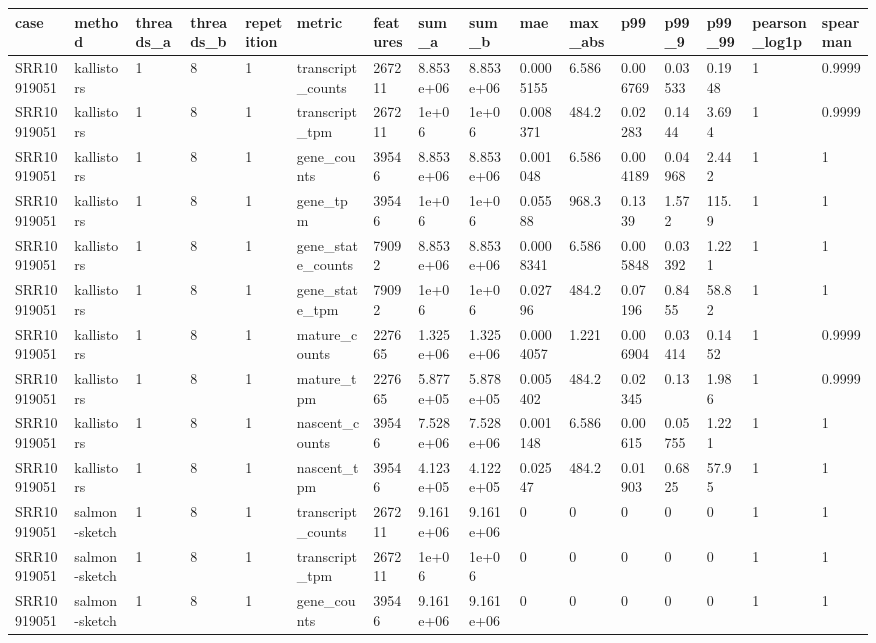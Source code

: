 \begin{tabular}{llllllllllllllll}
\toprule
case & method & threads\_a & threads\_b & repetition & metric & features & sum\_a & sum\_b & mae & max\_abs & p99 & p99\_9 & p99\_99 & pearson\_log1p & spearman \\
\midrule
SRR10919051 & kallistors & 1 & 8 & 1 & transcript\_counts & 267211 & 8.853e+06 & 8.853e+06 & 0.0005155 & 6.586 & 0.006769 & 0.03533 & 0.1948 & 1 & 0.9999 \\
SRR10919051 & kallistors & 1 & 8 & 1 & transcript\_tpm & 267211 & 1e+06 & 1e+06 & 0.008371 & 484.2 & 0.02283 & 0.1444 & 3.694 & 1 & 0.9999 \\
SRR10919051 & kallistors & 1 & 8 & 1 & gene\_counts & 39546 & 8.853e+06 & 8.853e+06 & 0.001048 & 6.586 & 0.004189 & 0.04968 & 2.442 & 1 & 1 \\
SRR10919051 & kallistors & 1 & 8 & 1 & gene\_tpm & 39546 & 1e+06 & 1e+06 & 0.05588 & 968.3 & 0.1339 & 1.572 & 115.9 & 1 & 1 \\
SRR10919051 & kallistors & 1 & 8 & 1 & gene\_state\_counts & 79092 & 8.853e+06 & 8.853e+06 & 0.0008341 & 6.586 & 0.005848 & 0.03392 & 1.221 & 1 & 1 \\
SRR10919051 & kallistors & 1 & 8 & 1 & gene\_state\_tpm & 79092 & 1e+06 & 1e+06 & 0.02796 & 484.2 & 0.07196 & 0.8455 & 58.82 & 1 & 1 \\
SRR10919051 & kallistors & 1 & 8 & 1 & mature\_counts & 227665 & 1.325e+06 & 1.325e+06 & 0.0004057 & 1.221 & 0.006904 & 0.03414 & 0.1452 & 1 & 0.9999 \\
SRR10919051 & kallistors & 1 & 8 & 1 & mature\_tpm & 227665 & 5.877e+05 & 5.878e+05 & 0.005402 & 484.2 & 0.02345 & 0.13 & 1.986 & 1 & 0.9999 \\
SRR10919051 & kallistors & 1 & 8 & 1 & nascent\_counts & 39546 & 7.528e+06 & 7.528e+06 & 0.001148 & 6.586 & 0.00615 & 0.05755 & 1.221 & 1 & 1 \\
SRR10919051 & kallistors & 1 & 8 & 1 & nascent\_tpm & 39546 & 4.123e+05 & 4.122e+05 & 0.02547 & 484.2 & 0.01903 & 0.6825 & 57.95 & 1 & 1 \\
SRR10919051 & salmon-sketch & 1 & 8 & 1 & transcript\_counts & 267211 & 9.161e+06 & 9.161e+06 & 0 & 0 & 0 & 0 & 0 & 1 & 1 \\
SRR10919051 & salmon-sketch & 1 & 8 & 1 & transcript\_tpm & 267211 & 1e+06 & 1e+06 & 0 & 0 & 0 & 0 & 0 & 1 & 1 \\
SRR10919051 & salmon-sketch & 1 & 8 & 1 & gene\_counts & 39546 & 9.161e+06 & 9.161e+06 & 0 & 0 & 0 & 0 & 0 & 1 & 1 \\

\end{tabular}
